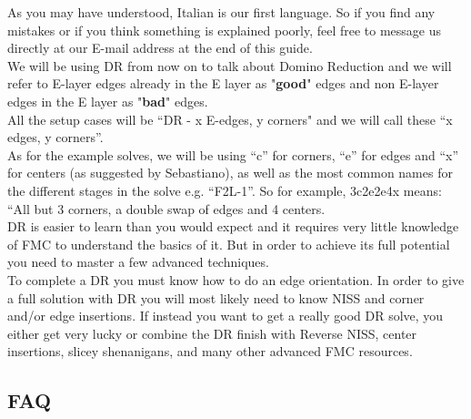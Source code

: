 \documentclass[11pt,a4paper]{book}
\begin{document}
As you may have understood, Italian is our first language. So if you find any mistakes or if you think something is explained poorly, feel free to message us directly at our E-mail address at the end of this guide.\\
\newline
We will be using DR from now on to talk about Domino Reduction and we will refer to E-layer edges already in the E layer as "\textbf{good}" edges and non E-layer edges in the E layer as "\textbf{bad}" edges.\\
All the setup cases will be “DR - x E-edges, y corners" and we will call these “x edges, y corners”.\\
As for the example solves, we will be using “c” for corners, “e” for edges and “x” for centers (as suggested by Sebastiano), as well as the most common names for the different stages in the solve e.g. “F2L-1”. So for example, 3c2e2e4x means: “All but 3 corners, a double swap of edges and 4 centers.\\
\newline
DR is easier to learn than you would expect and it requires very little knowledge of FMC to understand the basics of it. But in order to achieve its full potential you need to master a few advanced techniques.\\
To complete a DR you must know how to do an edge orientation. In order to give a full solution with DR you will most likely need to know NISS and corner and/or edge insertions. If instead you want to get a really good DR solve, you either get very lucky or combine the DR finish with Reverse NISS, center insertions, slicey shenanigans, and many other advanced FMC resources.

\tableofcontents

\bigskip
\newpage

\subsection*{FAQ}
\end{document}

